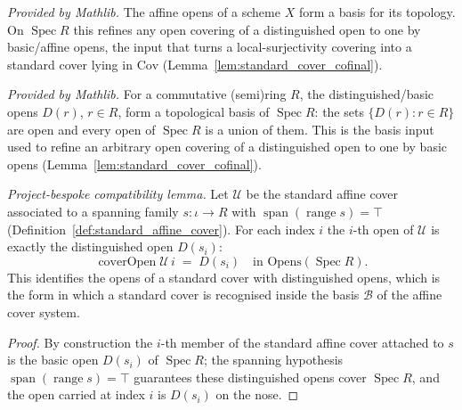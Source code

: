 \begin{lemma}
  \label{lem:scheme_isBasis_affineOpens}
  \mathlibok
  \textit{Provided by Mathlib.}
  The affine opens of a scheme \(X\) form a basis for its topology. On \(\operatorname{Spec} R\) this
  refines any open covering of a distinguished open to one by basic/affine opens, the input that
  turns a local-surjectivity covering into a standard cover lying in \(\mathrm{Cov}\)
  (Lemma~\ref{lem:standard_cover_cofinal}).
\end{lemma}

\begin{lemma}
  \label{lem:primeSpectrum_isBasis_basicOpen}
  \mathlibok
  \textit{Provided by Mathlib.}
  For a commutative (semi)ring \(R\), the distinguished/basic opens \(D(r)\), \(r \in R\), form a
  topological basis of \(\operatorname{Spec} R\): the sets \(\{D(r) : r \in R\}\) are open and every
  open of \(\operatorname{Spec} R\) is a union of them. This is the basis input used to refine an
  arbitrary open covering of a distinguished open to one by basic opens
  (Lemma~\ref{lem:standard_cover_cofinal}).
\end{lemma}

\begin{lemma}\leanok
  \label{lem:cover_datum_bridge}
  \textit{Project-bespoke compatibility lemma.}
  Let \(\mathcal{U}\) be the standard affine cover associated to a spanning family
  \(s : \iota \to R\) with \(\operatorname{span}(\operatorname{range} s) = \top\)
  (Definition~\ref{def:standard_affine_cover}). For each index \(i\) the \(i\)-th open of
  \(\mathcal{U}\) is exactly the distinguished open \(D(s_i)\):
  \[
    \operatorname{coverOpen} \mathcal{U}\, i \;=\; D(s_i)
    \quad\text{in } \mathrm{Opens}(\operatorname{Spec} R).
  \]
  This identifies the opens of a standard cover with distinguished opens, which is the form in
  which a standard cover is recognised inside the basis \(\mathcal{B}\) of the affine cover system.
\end{lemma}
\begin{proof}
  \leanok
  By construction the \(i\)-th member of the standard affine cover attached to \(s\) is the basic
  open \(D(s_i)\) of \(\operatorname{Spec} R\); the spanning hypothesis
  \(\operatorname{span}(\operatorname{range} s) = \top\) guarantees these distinguished opens cover
  \(\operatorname{Spec} R\), and the open carried at index \(i\) is \(D(s_i)\) on the nose.
\end{proof}

